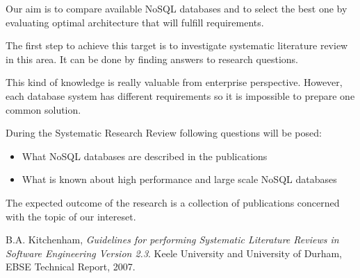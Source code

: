 \documentclass[times, 10pt,twocolumn]{article}
\newcounter{firstbib}
\begin{document}
Our aim is to compare available NoSQL databases and to select the best one by evaluating 
optimal architecture that will fulfill requirements. 

The first step to achieve this target is to investigate systematic literature review in this area.
It can be done by finding answers to research questions.

This kind of knowledge is really valuable from enterprise perspective. However, each database
system has different requirements so it is impossible to prepare one common solution. 


During the Systematic Research Review following questions will be posed: 

\begin{itemize}
  \item What NoSQL databases are described in the publications
  \item What is known about high performance and large scale NoSQL databases   
\end{itemize}

The expected outcome of the research is a collection of publications concerned with the topic of our intereset.
 




\renewcommand{\refname}{Article references}

\begin{thebibliography}{9}

	  B.A. Kitchenham,
	  \emph{Guidelines for performing Systematic Literature Reviews in Software Engineering Version 2.3}.
	  Keele University and University of Durham,
	  EBSE Technical Report,
	  2007.

	\setcounter{firstbib}{\value{enumiv}}

\end{thebibliography}

\renewcommand{\refname}{Systematic research review references} 
\end{document}
